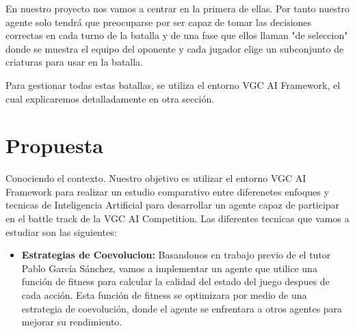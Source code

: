 En nuestro proyecto nos vamos a centrar en la primera de ellas. Por tanto nuestro agente solo tendrá que preocuparse por ser capaz de tomar las decisiones correctas en cada turno de la batalla y de una fase que ellos llaman "de seleccion" donde se muestra el equipo del oponente y cada jugador elige un subconjunto de criaturas para usar en la batalla.

Para gestionar todas estas batallas, se utiliza el entorno VGC AI Framework, el cual explicaremos detalladamente en otra sección.

\section{Propuesta}
Conociendo el contexto. Nuestro objetivo es utilizar el entorno VGC AI Framework para realizar un estudio comparativo entre diferenetes enfoques y tecnicas de Inteligencia Artificial para desarrollar un agente capaz de participar en el battle track de la VGC AI Competition. Las diferentes tecnicas que vamos a estudiar son las siguientes:

\begin{itemize}
    \item \textbf{Estrategias de Coevolucion:} Basandonos en trabajo previo de el tutor Pablo García Sánchez, vamos a implementar un agente que utilice una función de fitness para calcular la calidad del estado del juego despues de cada acción. Esta función de fitness se optimizara por medio de una estrategia de coevolución, donde el agente se enfrentara a otros agentes para mejorar su rendimiento.
\end{itemize}